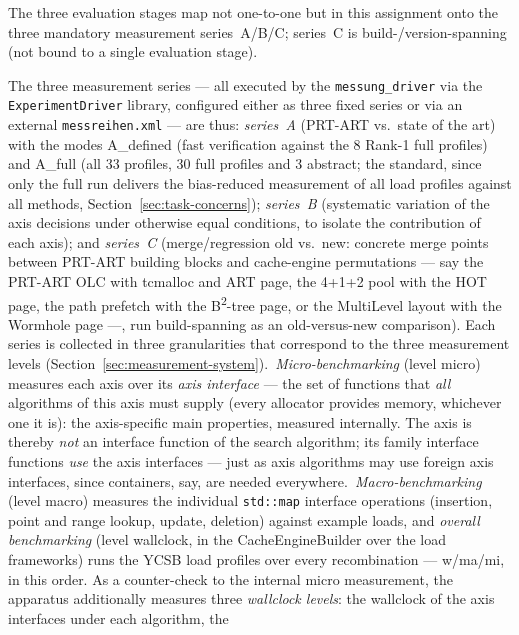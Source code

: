 \begin{nurlang}
\begin{table}[!htbp]
  \smallskip
  {\footnotesize The three evaluation stages map not one-to-one but in this assignment onto the
  three mandatory measurement series~A/B/C\@; series~C is build-/version-spanning (not bound to a single
  evaluation stage).\par}
\end{table}

The three measurement series --- all executed by the \texttt{messung\_driver} via the \texttt{ExperimentDriver} library,
configured either as three fixed series or via an external
\texttt{messreihen.xml} --- are thus: \emph{series~A} (PRT-ART vs.\ state of the art) with the modes A\_defined
(fast verification against the 8 Rank-1 full profiles) and A\_full (all 33 profiles, 30 full profiles and 3 abstract; the standard, since only the
full run delivers the bias-reduced measurement of all load profiles against all methods,
Section~\ref{sec:task-concerns}); \emph{series~B} (systematic variation of the
axis decisions under otherwise equal conditions, to isolate the contribution of each axis); and
\emph{series~C} (merge/regression old vs.\ new: concrete merge points between PRT-ART building blocks and
cache-engine permutations --- say the PRT-ART OLC with tcmalloc and ART page, the 4+1+2 pool with the
HOT page, the path prefetch with the B\textsuperscript{2}-tree page, or the MultiLevel layout with the
Wormhole page ---, run build-spanning as an old-versus-new comparison). Each series is
collected in three granularities that correspond to the three measurement levels
(Section~\ref{sec:measurement-system}).\ \emph{Micro-benchmarking} (level micro) measures each axis
over its \emph{axis interface} --- the set of functions that \emph{all} algorithms of this axis must
supply (every allocator provides memory, whichever one it is): the axis-specific
main properties, measured internally. The axis is thereby \emph{not} an interface function of the
search algorithm; its family interface functions \emph{use} the axis interfaces ---
just as axis algorithms may use foreign axis interfaces, since containers, say, are
needed everywhere.\ \emph{Macro-benchmarking} (level macro) measures the individual
\texttt{std::map} interface operations (insertion, point and range lookup, update,
deletion) against example loads, and \emph{overall benchmarking} (level wallclock, in the CacheEngineBuilder
over the load frameworks) runs the YCSB load profiles over every recombination --- w/ma/mi, in this
order. As a counter-check to the internal micro measurement, the apparatus additionally measures three
\emph{wallclock levels}: the wallclock of the axis interfaces under each algorithm, the

\end{nurlang}
